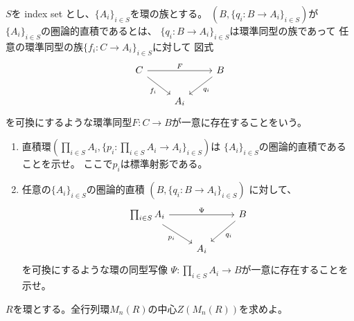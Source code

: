 \documentclass[report]{jlreq}
\begin{document}
\begin{problem}[代数学II 1.6]
    $S$を index set とし、$\{A_i\}_{i \in S}$を環の族とする。
    $(B, \{ q_i \colon B \to A_i \}_{i \in S})$が
    $\{ A_i \}_{i \in S}$の圏論的直積であるとは、
    $\{ q_i \colon B \to A_i \}_{i \in S}$は環準同型の族であって
    任意の環準同型の族$\{ f_i \colon C \to A_i \}_{i \in S}$に対して
    図式
    \begin{equation}
        \begin{tikzcd}
            C \ar{rd}[swap]{f_i} \ar{rr}{F} && B \ar{ld}{q_i} \\
            & A_i
        \end{tikzcd}
    \end{equation}
    を可換にするような環準同型$F \colon C \to B$が一意に存在することをいう。
    \begin{enumerate}[label=(\alph*)]
        \item 直積環$(\prod_{i \in S} A_i,
            \{ p_i \colon \prod_{i \in S} A_i \to A_i \}_{i \in S})$は
            $\{ A_i \}_{i \in S}$の圏論的直積であることを示せ。
            ここで$p_i$は標準射影である。
        \item 任意の$\{ A_i \}_{i \in S}$の圏論的直積
            $(B, \{ q_i \colon B \to A_i \}_{i \in S})$
            に対して、
            \begin{equation}
                \begin{tikzcd}
                    \prod_{i \in S} A_i
                        \ar{rd}[swap]{p_i} \ar{rr}{\Psi}
                        && B \ar{ld}{q_i} \\
                    & A_i
                \end{tikzcd}
            \end{equation}
            を可換にするような環の同型写像
            $\Psi \colon \prod_{i \in S} A_i \to B$が一意に存在することを示せ。
    \end{enumerate}
\end{problem}

\begin{answer}
    \TODO{}
\end{answer}


\begin{problem}[代数学II 1.7]
    $R$を環とする。全行列環$M_n(R)$の中心$Z(M_n(R))$を求めよ。
\end{problem}
\end{document}
